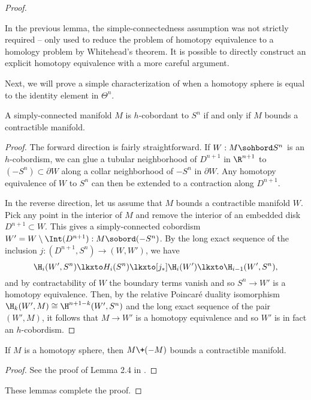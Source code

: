 \begin{proof}
	\begin{remark}
		In the previous lemma, the simple-connectedness assumption was not strictly required -- only used to reduce the problem of homotopy equivalence to a homology problem by Whitehead's theorem. It is possible to directly construct an explicit homotopy equivalence with a more careful argument.
	\end{remark}

	Next, we will prove a simple characterization of when a homotopy sphere is equal to the identity element in $\Theta^n$.

	\begin{lemma}\label{lemma:null-h-cobordant-iff-bounds-contractible}
		A simply-connected manifold $M$ is $h$-cobordant to $S^n$ if and only if $M$ bounds a contractible manifold.
	\end{lemma}
	\begin{proof}
		The forward direction is fairly straightforward. If $W : M\sohbord S^n$ is an $h$-cobordism, we can glue a tubular neighborhood of $D^{n+1}$ in $\R^{n+1}$ to $(-S^n)\subset \partial W$ along a collar neighborhood of $-S^n$ in $\partial W$. Any homotopy equivalence of $W$ to $S^n$ can then be extended to a contraction along $D^{n+1}$.

		In the reverse direction, let us assume that $M$ bounds a contractible manifold $W$. Pick any point in the interior of $M$ and remove the interior of an embedded disk $D^{n+1}\subset W$. This gives a simply-connected cobordism $W'=W\setminus \Int(D^{n+1}) : M\sobord (-S^n)$. By the long exact sequence of the inclusion $j : (D^{n+1}, S^n) \to (W,W')$, we have
		\[
			\H_i(W', S^n) \lkxto H_i(S^n)\lkxto[j_*] \H_i(W')\lkxto \H_{i-1}(W',S^n),
		\]
		and by contractability of $W$ the boundary terms vanish and so $S^n \to W'$ is a homotopy equivalence. Then, by the relative Poincar\'e duality isomorphism $\H_k(W',M)\cong \H^{n+1-k}(W', S^n)$ and the long exact sequence of the pair $(W',M)$, it follows that $M\to W'$ is a homotopy equivalence and so $W'$ is in fact an $h$-cobordism. 
	\end{proof}

	\begin{lemma}
		If $M$ is a homotopy sphere, then $M\+(-M)$ bounds a contractible manifold.
	\end{lemma}
	\begin{proof}
		See the proof of Lemma 2.4 in \cite{milnorkervaire1963groups}.
	\end{proof}

	These lemmas complete the proof.
\end{proof}

